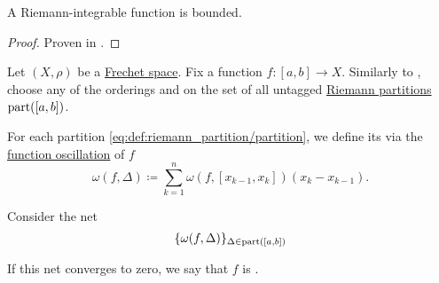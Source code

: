 \begin{corollary}\label{thm:riemann_integrable_implies_bounded}
  A Riemann-integrable function is bounded.
\end{corollary}
\begin{proof}
  Proven in .
\end{proof}

\begin{definition}\label{def:darboux_integrability}
  Let \( (X, \rho) \) be a \hyperref[def:frechet_space]{Frechet space}. Fix a function \( f: [a, b] \to X \). Similarly to , choose any of the orderings  and  on the set of all untagged \hyperref[def:riemann_partition/partition]{Riemann partitions} \( \operatorname{part}([a, b]) \).

  For each partition \eqref{eq:def:riemann_partition/partition}, we define its  via the \hyperref[def:function_oscillation]{function oscillation} of \( f \)
  \begin{equation}\label{eq:def:darboux_integrability/oscillation}
    \omega(f, \Delta) \coloneqq \sum_{k=1}^n \omega(f, [x_{k-1}, x_k]) (x_k - x_{k-1}).
  \end{equation}

  Consider the net
  \begin{equation}\label{eq:def:darboux_integrability/net}
    \{ \omega(f, \Delta) \}_{\Delta \in \operatorname{part}([a, b])}
  \end{equation}

  If this net converges to zero, we say that \( f \) is .
\end{definition}

